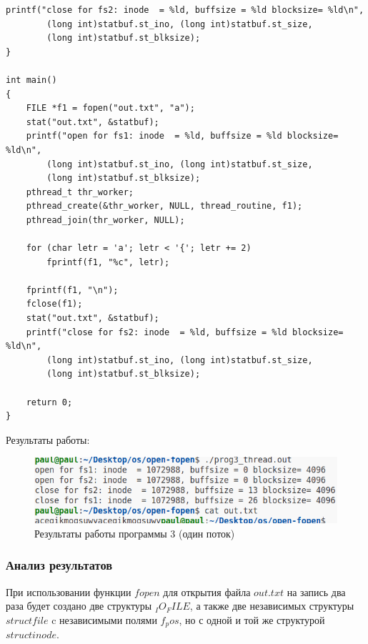 \begin{center}
	\captionsetup{justification=raggedright,singlelinecheck=off}

	\begin{lstlisting}[label=lst:prog3-th-2,caption=Программа 3 --- два потока --- часть 2]
    printf("close for fs2: inode  = %ld, buffsize = %ld blocksize= %ld\n",
        (long int)statbuf.st_ino, (long int)statbuf.st_size,
        (long int)statbuf.st_blksize);
}

int main() 
{
    FILE *f1 = fopen("out.txt", "a");
    stat("out.txt", &statbuf);
    printf("open for fs1: inode  = %ld, buffsize = %ld blocksize= %ld\n",
        (long int)statbuf.st_ino, (long int)statbuf.st_size,
        (long int)statbuf.st_blksize);
    pthread_t thr_worker;
    pthread_create(&thr_worker, NULL, thread_routine, f1);
    pthread_join(thr_worker, NULL);

    for (char letr = 'a'; letr < '{'; letr += 2) 
        fprintf(f1, "%c", letr);

    fprintf(f1, "\n");
    fclose(f1);
    stat("out.txt", &statbuf);
    printf("close for fs2: inode  = %ld, buffsize = %ld blocksize= %ld\n",
        (long int)statbuf.st_ino, (long int)statbuf.st_size,
        (long int)statbuf.st_blksize);

    return 0;
}
	\end{lstlisting}
\end{center}

\clearpage

Результаты работы:

\begin{figure}[h]
	\centering
	\captionsetup{justification=centering}
	\includegraphics[width=150mm]{img/prog3_thread.png}
	\caption{Результаты работы программы 3 (один поток)}
	\label{fig:prog-3-th-result}
\end{figure}

\subsubsection*{Анализ результатов}

При использовании функции $fopen$ для открытия файла $out.txt$ на запись два раза будет создано две структуры $_IO_FILE$, а также две независимых структуры $struct file$ c независимыми полями $f_pos$, но с одной и той же структурой $struct inode$.

